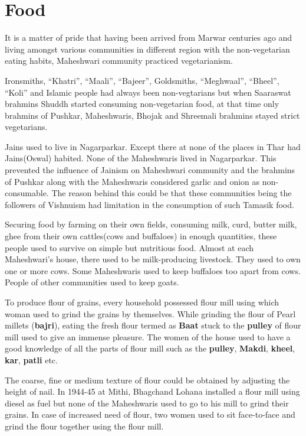\section{Food}
It is a matter of pride that having been arrived from Marwar centuries ago and
living amongst various communities in different region with the non-vegetarian
eating habits, Maheshwari community practiced vegetarianism.

Ironsmiths, ``Khatri'', ``Maali'', ``Bajeer'', Goldsmiths, ``Meghwaal'',
``Bheel'', ``Koli'' and Islamic people had always been non-vegtarians but when
Saaraswat brahmins Shuddh started consuming non-vegetarian food, at that time
only brahmins of Pushkar, Maheshwaris, Bhojak and Shreemali brahmins stayed
strict vegetarians.

Jains used to live in Nagarparkar. Except there at none of the places in Thar
had Jains(Oswal) habited. None of the Maheshwaris lived in Nagarparkar. This
prevented the influence of Jainism on Maheshwari community and the brahmins of
Pushkar along with the Maheshwaris considered garlic and onion as
non-consumable. The reason behind this could be that these communities being the
followers of Vishnuism had limitation in the consumption of such Tamasik food.

Securing food by farming on their own fields, consuming milk, curd, butter milk,
ghee from their own cattles(cows and buffaloes) in enough quantities, these
people used to survive on simple but nutritious food. Almost at each
Maheshwari's house, there used to be milk-producing livestock. They used to own
one or more cows. Some Maheshwaris used to keep buffaloes too apart from cows.
People of other communities used to keep goats.

To produce flour of grains, every household possessed flour mill using which
woman used to grind the grains by themselves. While grinding the flour of Pearl
millets (\textbf{bajri}), eating the fresh flour termed as \textbf{Baat} stuck
to the \textbf{pulley} of flour mill used to give an immense pleasure. The women
of the house used to have a good knowledge of all the parts of flour mill such
as the \textbf{pulley}, \textbf{Makdi}, \textbf{kheel}, \textbf{kar},
\textbf{patli} etc.

The coarse, fine or medium texture of flour could be obtained by adjusting the
height of nail. In 1944-45 at Mithi, Bhagchand Lohana installed a flour mill
using diesel as fuel but none of the Maheshwaris used to go to his mill to grind
their grains. In case of increased need of flour, two women used to sit
face-to-face and grind the flour together using the flour mill.

